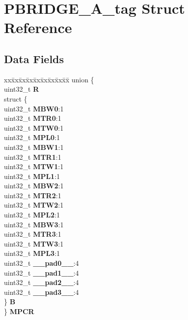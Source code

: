 \hypertarget{structPBRIDGE__A__tag}{}\section{P\+B\+R\+I\+D\+G\+E\+\_\+\+A\+\_\+tag Struct Reference}
\label{structPBRIDGE__A__tag}
\subsection*{Data Fields}
\begin{DoxyCompactItemize}
\item 
\mbox{\label{structPBRIDGE__A__tag_a954a767b208b9b78f2c4c3ec52e4c10d}} 
\begin{tabbing}
xx\=xx\=xx\=xx\=xx\=xx\=xx\=xx\=xx\=\kill
union \{\\
\>uint32\_t {\bfseries R}\\
\>struct \{\\
\>\>uint32\_t {\bfseries MBW0}:1\\
\>\>uint32\_t {\bfseries MTR0}:1\\
\>\>uint32\_t {\bfseries MTW0}:1\\
\>\>uint32\_t {\bfseries MPL0}:1\\
\>\>uint32\_t {\bfseries MBW1}:1\\
\>\>uint32\_t {\bfseries MTR1}:1\\
\>\>uint32\_t {\bfseries MTW1}:1\\
\>\>uint32\_t {\bfseries MPL1}:1\\
\>\>uint32\_t {\bfseries MBW2}:1\\
\>\>uint32\_t {\bfseries MTR2}:1\\
\>\>uint32\_t {\bfseries MTW2}:1\\
\>\>uint32\_t {\bfseries MPL2}:1\\
\>\>uint32\_t {\bfseries MBW3}:1\\
\>\>uint32\_t {\bfseries MTR3}:1\\
\>\>uint32\_t {\bfseries MTW3}:1\\
\>\>uint32\_t {\bfseries MPL3}:1\\
\>\>uint32\_t {\bfseries \_\_pad0\_\_}:4\\
\>\>uint32\_t {\bfseries \_\_pad1\_\_}:4\\
\>\>uint32\_t {\bfseries \_\_pad2\_\_}:4\\
\>\>uint32\_t {\bfseries \_\_pad3\_\_}:4\\
\>\} {\bfseries B}\\
\} {\bfseries MPCR}\\


\end{tabbing}
\end{DoxyCompactItemize}
